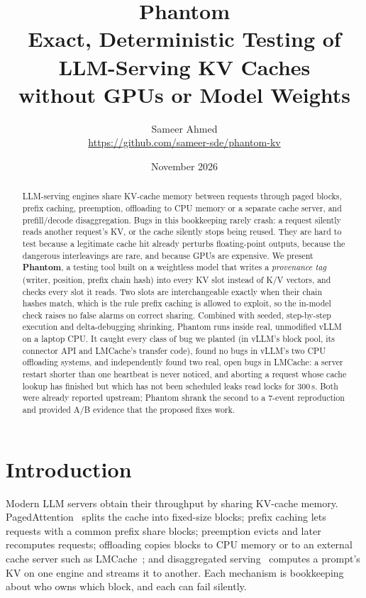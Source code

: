 \documentclass[10pt]{article}
\title{\textbf{Phantom}\\[4pt]\Large Exact, Deterministic Testing of LLM-Serving KV Caches\\without GPUs or Model Weights}
\author{Sameer Ahmed\\\small\url{https://github.com/sameer-sde/phantom-kv}}
\date{November 2026}
\begin{document}
\maketitle

\begin{abstract}
LLM-serving engines share KV-cache memory between requests through paged
blocks, prefix caching, preemption, offloading to CPU memory or a separate
cache server, and prefill/decode disaggregation. Bugs in this bookkeeping
rarely crash: a request silently reads another request's KV, or the cache
silently stops being reused. They are hard to test because a legitimate
cache hit already perturbs floating-point outputs, because the dangerous
interleavings are rare, and because GPUs are expensive. We present
\textbf{Phantom}, a testing tool built on a weightless model that writes a
\emph{provenance tag} (writer, position, prefix chain hash) into every KV
slot instead of K/V vectors, and checks every slot it reads. Two slots are
interchangeable exactly when their chain hashes match, which is the rule
prefix caching is allowed to exploit, so the in-model check raises no false
alarms on correct sharing. Combined with seeded, step-by-step execution and
delta-debugging shrinking, Phantom runs inside real, unmodified vLLM on a
laptop CPU. It caught every class of bug we planted (in vLLM's block pool,
its connector API and LMCache's transfer code), found no bugs in vLLM's two
CPU offloading systems, and independently found two real, open bugs in
LMCache: a server restart shorter than one heartbeat is never noticed, and
aborting a request whose cache lookup has finished but which has not been
scheduled leaks read locks for 300\,s. Both were already reported upstream;
Phantom shrank the second to a 7-event reproduction and provided A/B
evidence that the proposed fixes work.
\end{abstract}

\section{Introduction}
Modern LLM servers obtain their throughput by sharing KV-cache memory.
PagedAttention~\cite{kwon2023vllm} splits the cache into fixed-size blocks;
prefix caching lets requests with a common prefix share blocks; preemption
evicts and later recomputes requests; offloading copies blocks to CPU memory
or to an external cache server such as LMCache~\cite{liu2025lmcache}; and
disaggregated serving~\cite{zhong2024distserve,patel2024splitwise} computes a
prompt's KV on one engine and streams it to another. Each mechanism is
bookkeeping about who owns which block, and each can fail silently.
\end{document}
